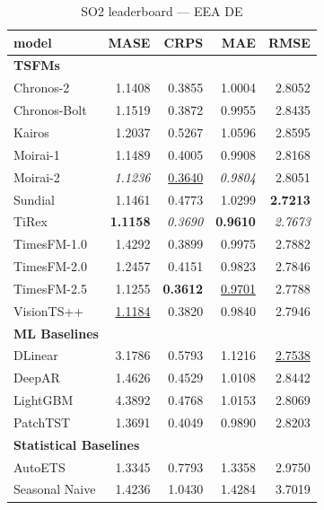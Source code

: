 \begin{table}[H]
\caption{SO2 leaderboard --- EEA DE}
\centering
\begin{small}
\begin{tabular}{lrrrr}
\toprule
model & MASE & CRPS & MAE & RMSE \\
\midrule
\multicolumn{5}{l}{\textbf{TSFMs}} \\
Chronos-2 & 1.1408 & 0.3855 & 1.0004 & 2.8052 \\
Chronos-Bolt & 1.1519 & 0.3872 & 0.9955 & 2.8435 \\
Kairos & 1.2037 & 0.5267 & 1.0596 & 2.8595 \\
Moirai-1 & 1.1489 & 0.4005 & 0.9908 & 2.8168 \\
Moirai-2 & \textit{1.1236} & \underline{0.3640} & \textit{0.9804} & 2.8051 \\
Sundial & 1.1461 & 0.4773 & 1.0299 & \textbf{2.7213} \\
TiRex & \textbf{1.1158} & \textit{0.3690} & \textbf{0.9610} & \textit{2.7673} \\
TimesFM-1.0 & 1.4292 & 0.3899 & 0.9975 & 2.7882 \\
TimesFM-2.0 & 1.2457 & 0.4151 & 0.9823 & 2.7846 \\
TimesFM-2.5 & 1.1255 & \textbf{0.3612} & \underline{0.9701} & 2.7788 \\
VisionTS++ & \underline{1.1184} & 0.3820 & 0.9840 & 2.7946 \\
\midrule
\multicolumn{5}{l}{\textbf{ML Baselines}} \\
DLinear & 3.1786 & 0.5793 & 1.1216 & \underline{2.7538} \\
DeepAR & 1.4626 & 0.4529 & 1.0108 & 2.8442 \\
LightGBM & 4.3892 & 0.4768 & 1.0153 & 2.8069 \\
PatchTST & 1.3691 & 0.4049 & 0.9890 & 2.8203 \\
\midrule
\multicolumn{5}{l}{\textbf{Statistical Baselines}} \\
AutoETS & 1.3345 & 0.7793 & 1.3358 & 2.9750 \\
Seasonal Naive & 1.4236 & 1.0430 & 1.4284 & 3.7019 \\
\bottomrule
\end{tabular}
\end{small}
\end{table}